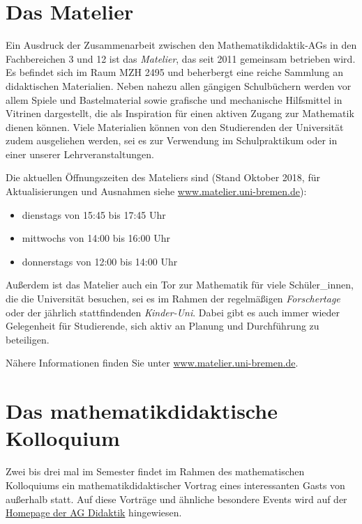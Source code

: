 \documentclass[ngerman,bibliography=totoc,oneside,12pt,a4paper]{scrbook}
\begin{document}
\section{Das Matelier}\label{das-matelier}

Ein Ausdruck der Zusammenarbeit zwischen den Mathematikdidaktik-AGs in
den Fachbereichen 3 und 12 ist das \emph{Matelier}, das seit 2011
gemeinsam betrieben wird. Es befindet sich im Raum MZH 2495 und
beherbergt eine reiche Sammlung an didaktischen Materialien. Neben
nahezu allen gängigen Schulbüchern werden vor allem Spiele und
Bastelmaterial sowie grafische und mechanische Hilfsmittel in Vitrinen
dargestellt, die als Inspiration für einen aktiven Zugang zur Mathematik
dienen können. Viele Materialien können von den Studierenden der
Universität zudem ausgeliehen werden, sei es zur Verwendung im
Schulpraktikum oder in einer unserer Lehrveranstaltungen.

Die aktuellen Öffnungszeiten des Mateliers sind (Stand Oktober 2018, für
Aktualisierungen und Ausnahmen siehe
\href{https://www.matelier.uni-bremen.de}{www.matelier.uni-bremen.de}):

\begin{itemize}
\item
  dienstags von 15:45 bis 17:45 Uhr
\item
  mittwochs von 14:00 bis 16:00 Uhr
\item
  donnerstags von 12:00 bis 14:00 Uhr
\end{itemize}

Außerdem ist das Matelier auch ein Tor zur Mathematik für viele
Schüler\_innen, die die Universität besuchen, sei es im Rahmen der
regelmäßigen \emph{Forschertage} oder der jährlich stattfindenden
\emph{Kinder-Uni}. Dabei gibt es auch immer wieder Gelegenheit für
Studierende, sich aktiv an Planung und Durchführung zu beteiligen.

Nähere Informationen finden Sie unter
\href{https://www.matelier.uni-bremen.de}{www.matelier.uni-bremen.de}.

\section{Das mathematikdidaktische
Kolloquium}\label{das-mathematikdidaktische-kolloquium}

Zwei bis drei mal im Semester findet im Rahmen des mathematischen
Kolloquiums ein mathematikdidaktischer Vortrag eines interessanten Gasts
von außerhalb statt. Auf diese Vorträge und ähnliche besondere Events
wird auf der \href{http://www.math.uni-bremen.de/didaktik/}{Homepage der
AG Didaktik} hingewiesen.
\end{document}

